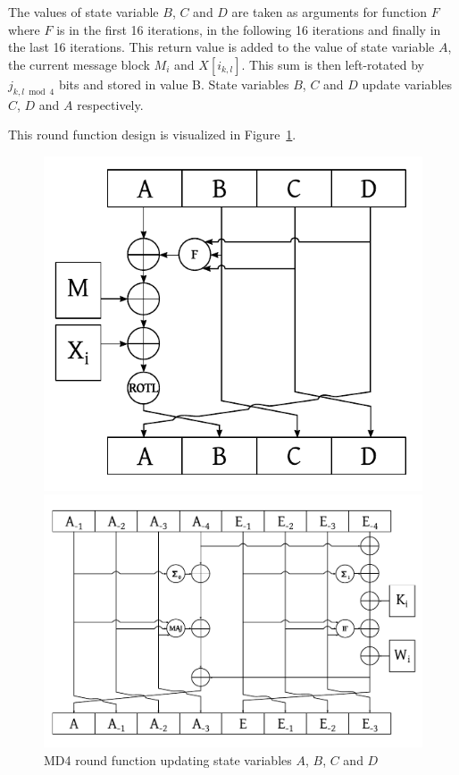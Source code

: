 \begin{description}
    The values of state variable $B$, $C$ and $D$ are taken as arguments
    for function $F$ where $F$ is  in the first 16 iterations,
     in the following 16 iterations and finally 
    in the last 16 iterations. This return value is added to the value of state
    variable $A$, the current message block $M_i$ and $X[i_{k,l}]$. This sum is then left-rotated by
    $j_{k,l \bmod{4}}$ bits and stored in value B. State variables $B$, $C$ and
    $D$ update variables $C$, $D$ and $A$ respectively.
    
    This round function design is visualized in Figure~\ref{fig:md4-round-function}.
\end{description}

\begin{figure}[p]
  \begin{center}
    \includegraphics{img/md4.pdf}
    \caption{MD4 round function updating state variables $A$, $B$, $C$ and $D$}
    \label{fig:md4-round-function}
  \end{center}
  \begin{center}
    \includegraphics[width=\textwidth]{img/sha256.pdf}

\end{center}
\end{figure}
